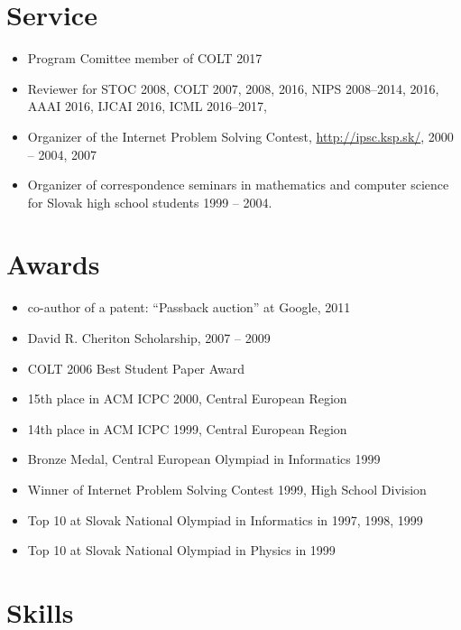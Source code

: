 \documentclass[10pt]{article}
\begin{document}
\section*{Service}

\begin{itemize}
\item Program Comittee member of COLT 2017
\item Reviewer for STOC 2008, COLT 2007, 2008, 2016, NIPS 2008--2014, 2016, AAAI 2016, IJCAI 2016, ICML 2016--2017,
\item Organizer of the Internet Problem Solving Contest, \url{http://ipsc.ksp.sk/}, 2000 -- 2004, 2007
\item Organizer of correspondence seminars in mathematics and computer science for Slovak high school students 1999 -- 2004.
\end{itemize}

\section*{Awards}

\begin{itemize}
\item co-author of a patent: ``Passback auction'' at Google, 2011
\item David R. Cheriton Scholarship, 2007 -- 2009
\item COLT 2006 Best Student Paper Award
\item 15th place in ACM ICPC 2000, Central European Region
\item 14th place in ACM ICPC 1999, Central European Region
\item Bronze Medal, Central European Olympiad in Informatics 1999
\item Winner of Internet Problem Solving Contest 1999, High School Division
\item Top 10 at Slovak National Olympiad in Informatics in 1997, 1998, 1999
\item Top 10 at Slovak National Olympiad in Physics in 1999
\end{itemize}

\renewcommand{\refname}{Publications}
\nocite{*}



\section*{Skills}
\end{document}
